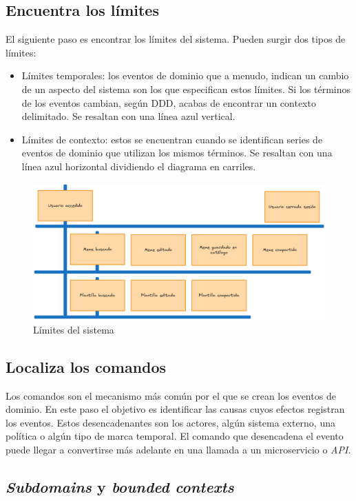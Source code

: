 \subsection{Encuentra los límites}

El siguiente paso es encontrar los límites del sistema. Pueden surgir dos tipos de límites:

\begin{itemize}
    \item Límites temporales: los eventos de dominio que a menudo, indican un cambio de un aspecto del sistema son los que especifican estos límites. Si los términos de los eventos cambian, según DDD, acabas de encontrar un contexto delimitado. Se resaltan con una línea azul vertical.
    \item Límites de contexto: estos se encuentran cuando se identifican series de eventos de dominio que utilizan los mismos términos. Se resaltan con una línea azul horizontal dividiendo el diagrama en carriles.
\end{itemize}

\begin{figure}[ht]
    \caption{Límites del sistema}
    \centering
    \vspace*{0.5cm}
    \includegraphics[scale=0.15]{figuras/limites.png}
\end{figure}

\subsection{Localiza los comandos}

Los comandos son el mecanismo más común por el que se crean los eventos de dominio. En este paso el objetivo es identificar las causas cuyos efectos registran los eventos. Estos desencadenantes son los actores, algún sistema externo, una política o algún tipo de marca temporal. El comando que desencadena el evento puede llegar a convertirse más adelante en una llamada a un microservicio o \textit{API}. 



\subsection{\textit{Subdomains} y \textit{bounded contexts}}



